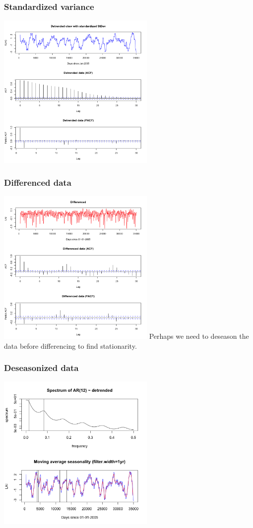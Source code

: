 \documentclass{beamer}
\begin{document}
\begin{frame}
    \frametitle{Standardized variance}
    \includegraphics[height=3in]{../img/detrended_stdzd_acf_pacf.png}
\end{frame}

\begin{frame}
    \frametitle{Differenced data}
    \includegraphics[height=3in]{../img/differenced_acf_pacf.png}
    Perhaps we need to deseason the data before differencing to find
    stationarity.
\end{frame}

\begin{frame}
    \frametitle{Deseasonized data}
    \includegraphics[height=3in]{../img/deseasonalization_spectrum.png}
\end{frame}
\end{document}
